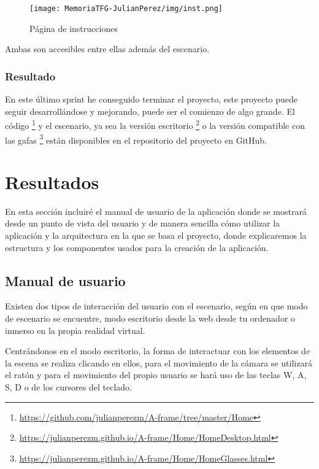\documentclass[a4paper, 12pt]{book}
\begin{document}
\begin{figure}[H]
  \centering
  \texttt{[image: MemoriaTFG-JulianPerez/img/inst.png]}
  \caption{Página de instrucciones}\label{home}
\end{figure}

Ambas son accesibles entre ellas además del escenario.

\subsection{Resultado}

En este último sprint he conseguido terminar el proyecto, este proyecto puede seguir desarrollándose y mejorando, puede ser el comienzo de algo grande. El código \footnote{\url{https://github.com/julianperezm/A-frame/tree/master/Home}}  y el escenario, ya sea la versión escritorio \footnote{\url{https://julianperezm.github.io/A-frame/Home/HomeDesktop.html}} o la versión compatible con las gafas \footnote{\url{https://julianperezm.github.io/A-frame/Home/HomeGlasses.html}} están disponibles en el repositorio del proyecto en GitHub.


\cleardoublepage
\chapter{Resultados}

En esta sección incluiré el manual de usuario de la aplicación donde se mostrará  desde un punto de vista del usuario y de  manera sencilla cómo utilizar la aplicación y la arquitectura en la que se basa el proyecto, donde explicaremos la estructura y los componentes usados para la creación de la aplicación.

\section{Manual de usuario} 
\label{sec:manual de usuario}

Existen dos tipos de interacción del usuario con el escenario, según en que modo de escenario se encuentre, modo escritorio desde la web desde tu ordenador  o inmerso en la propia realidad virtual.

Centrándonos en el modo escritorio, la forma de interactuar con los elementos de la escena se realiza clicando en ellos, para el movimiento de la cámara se utilizará el ratón y para el movimiento del propio usuario se hará uso de las teclas W, A, S, D o de los cursores del teclado. 
\end{document}
